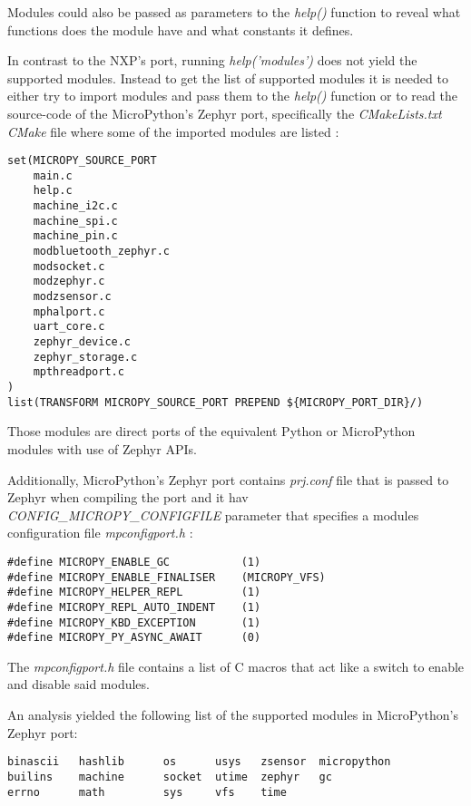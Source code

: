 \documentclass[twoside, 12pt]{article}
\begin{document}
Modules could also be passed as parameters to the \textit{help()} function to reveal what 
functions does the module have and what constants it defines.

\label{zephyr_mpy_moduels}
In contrast to the NXP's port, running \textit{help('modules')} does not yield the supported 
modules. Instead to get the list of supported modules it is needed to either try to import 
modules and pass them to the \textit{help()} function or to read the source-code of the 
MicroPython's Zephyr port, specifically the \textit{CMakeLists.txt CMake} file where some of 
the imported modules are listed :
\begin{lstlisting}[caption=Zephyr port CMake list, breaklines=true]
set(MICROPY_SOURCE_PORT
    main.c
    help.c
    machine_i2c.c
    machine_spi.c
    machine_pin.c
    modbluetooth_zephyr.c
    modsocket.c
    modzephyr.c
    modzsensor.c
    mphalport.c
    uart_core.c
    zephyr_device.c
    zephyr_storage.c
    mpthreadport.c
)
list(TRANSFORM MICROPY_SOURCE_PORT PREPEND ${MICROPY_PORT_DIR}/)
\end{lstlisting}

Those modules are direct ports of the equivalent Python or MicroPython modules with use of 
Zephyr APIs.

Additionally, MicroPython's Zephyr port contains \textit{prj.conf} file that is passed to 
Zephyr when compiling the port and it hav \textit{CONFIG\_MICROPY\_CONFIGFILE} parameter that
specifies a modules configuration file \textit{mpconfigport.h} :
\begin{lstlisting}[caption=Part of MicroPython's Zephyr port mpconfigport.h module conifguration file, breaklines=true]
#define MICROPY_ENABLE_GC           (1)
#define MICROPY_ENABLE_FINALISER    (MICROPY_VFS)
#define MICROPY_HELPER_REPL         (1)
#define MICROPY_REPL_AUTO_INDENT    (1)
#define MICROPY_KBD_EXCEPTION       (1)
#define MICROPY_PY_ASYNC_AWAIT      (0)
\end{lstlisting}

The \textit{mpconfigport.h} file contains a list of C macros\cite{kernighan_c} that act like 
a switch to enable and disable said modules.

An analysis yielded the following list of the supported modules in MicroPython's Zephyr port:
\begin{lstlisting}[caption=Zephyr port modules, breaklines=true]
binascii   hashlib      os      usys   zsensor  micropython
builins    machine      socket  utime  zephyr   gc
errno      math         sys     vfs    time
\end{lstlisting}
\end{document}
